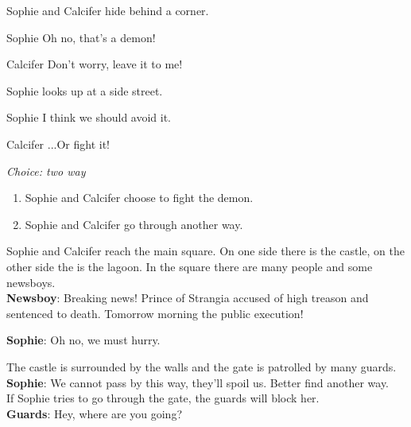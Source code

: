 \begin{screenplay}

Sophie and Calcifer hide behind a corner. 

\begin{dialogue}[worried]{Sophie}
Oh no, that’s a demon!
\end{dialogue}
\begin{dialogue}[feisty]{Calcifer}
Don’t worry, leave it to me!
\end{dialogue}

Sophie looks up at a side street.

\begin{dialogue}{Sophie}
I think we should avoid it.
\end{dialogue}

\begin{dialogue}{Calcifer}
...Or fight it!
\end{dialogue}
\end{screenplay}

\textit{Choice: two way}
\begin{enumerate}
  \item Sophie and Calcifer choose to fight the demon.
  \item Sophie and Calcifer go through another way.
\end{enumerate}
  
\noindent Sophie and Calcifer reach the main square. On one side there is the castle, on the other side the is the lagoon.
In the square there are many people and some newsboys.\\

\textbf{Newsboy}: Breaking news! Prince of Strangia accused of high treason and sentenced to death. Tomorrow morning the public execution!

\textbf{Sophie}: Oh no, we must hurry.

The castle is surrounded by the walls and the gate is patrolled by many guards.\\

\textbf{Sophie}: We cannot pass by this way, they’ll spoil us. Better find another way.\\

\noindent If Sophie tries to go through the gate, the guards will block her.\\

\textbf{Guards}: Hey, where are you going?\\

